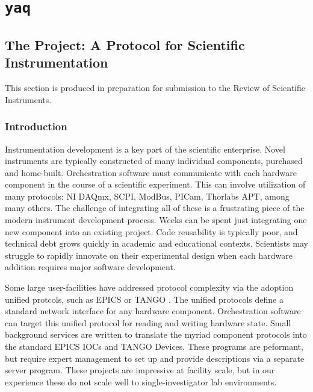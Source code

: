 \chapter{\texttt{yaq}} \label{cha:yaq}

\newcommand\yaqcqtpy{\texttt{yaqc-qtpy}}
\clearpage

\section{The \yaq{} Project: A Protocol for Scientific Instrumentation}



This section is produced in preparation for submission to the Review of Scientific Instruments.

\subsection{Introduction}

Instrumentation development is a key part of the scientific enterprise.
Novel instruments are typically constructed of many individual components, purchased and home-built.
Orchestration software must communicate with each hardware component in the course of a scientific experiment.
This can involve utilization of many protocols: NI DAQmx\cite{nidaqmx}, SCPI\cite{scpi}, ModBus\cite{modbus}, PICam\cite{picam}, Thorlabs APT\cite{thorlabs_apt}, among many others.
The challenge of integrating all of these is a frustrating piece of the modern instrument development process.
Weeks can be spent just integrating one new component into an existing project.
Code reusability is typically poor, and technical debt grows quickly in academic and educational contexts.
Scientists may struggle to rapidly innovate on their experimental design when each hardware addition requires major software development.

Some large user-facilities have addressed protocol complexity via the adoption unified protcols, such as EPICS \cite{DalesioLR1991a} or TANGO \cite{AGotz1999TANGOA}.
The unified protocols define a standard network interface for any hardware component.
Orchestration software can target this unified protocol for reading and writing hardware state.
Small background services are written to translate the myriad component protocols into the standard EPICS IOCs and TANGO Devices.
These programs are peformant, but require expert management to set up and provide descriptions via a separate server program.
These projects are impressive at facility scale, but in our experience these do not scale well to single-investigator lab environments.

